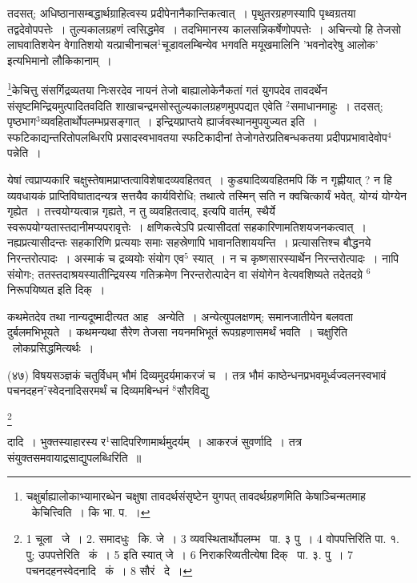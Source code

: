 \documentclass[11pt, openany]{book}
\newcommand\blfootnote[1]{%
 \begingroup
 \renewcommand\thefootnote{}\footnote{#1}%
 \addtocounter{footnote}{-1}%
 \endgroup
}
\begin{document}
\newpage
तदसत्; अधिष्ठानासम्बद्धार्थग्राहित्वस्य प्रदीपेनानैकान्तिकत्वात्~। पृथुतरग्रहणस्यापि पृथ्वग्रतया तद्वदेवोपपत्तेः~। तुल्यकालग्रहणं त्वसिद्धमेव~। तदभिमानस्य कालसन्निकर्षेणोपपत्तेः~। अचिन्त्यो हि तेजसो लाघवातिशयेन वेगातिशयो यत्प्राचीनाचल$^1$चूडावलम्बिन्येव भगवति मयूखमालिनि 'भवनोदरेषु आलोक' इत्यभिमानो लौकिकानाम्~।

\renewcommand{\thefootnote}{१}\footnote{चक्षुर्बाह्यालोकाभ्यामारब्धेन चक्षुषा तावदर्थसंसृष्टेन युगपत् तावदर्थग्रहणमिति केषाञ्चिन्मतमाह \textendash\ केचित्त्विति~। कि भा. प.~।}केचित्तु संसर्गिद्रव्यतया निःसरदेव नायनं तेजो बाह्यालोकेनैकतां गतं युगपदेव तावदर्थेन संसृष्टमिन्द्रियमुत्पादितवदिति शाखाचन्द्रमसोस्तुल्यकालग्रहणमुपपद्यत एवेति ${}^2$समाधानमाहुः~। तदसत्; पृष्ठभाग$^3$व्यवहितार्थोपलम्भप्रसङ्गात्~। इन्द्रियप्राप्तये ह्यार्जवस्थानमुपयुज्यत इति~। स्फटिकाद्यन्तरितोपलब्धिरपि प्रसादस्वभावतया स्फटिकादीनां तेजोगतेरप्रतिबन्धकतया प्रदीपप्रभावादेवोप$^4$पन्नेति~।

येषां त्वप्राप्यकारि चक्षुस्तेषामप्राप्तत्वाविशेषादव्यवहितवत्~। कुड्यादिव्यवहितमपि किं न गृह्णीयात् ? न हि व्यवधायकं प्राप्तिविघातादन्यत्र सत्तयैव कार्यविरोधि; तथात्वे तस्मिन् सति न क्वचित्कार्यं भवेत्, योग्यं योग्येन गृह्येत~। तत्त्वयोग्यत्वान्न गृह्यते, न तु व्यवहितत्वाद्, इत्यपि वार्तम्, स्थैर्ये स्वरूपयोग्यतास्तदानीमप्यपरावृत्तेः~। क्षणिकत्वेऽपि प्रत्यासीदतां सहकारिणामतिशयजनकत्वात्~। नह्यप्रत्यासीदन्तः सहकारिणि प्रत्ययाः समाः सहस्रेणापि भावानतिशाययन्ति~। प्रत्यासत्तिश्च बौद्धनये निरन्तरोत्पादः~। अस्माकं च द्रव्ययोः संयोग एव$^5$ स्यात्~। न च कृष्णसारस्यार्थेन निरन्तरोत्पादः~। नापि संयोगः; ततस्तदाश्रयस्यातीन्द्रियस्य गतिक्रमेण निरन्तरोत्पादेन वा संयोगेन वेत्यवशिष्यते तदेतदग्रे ${}^6$निरूपयिष्यत इति दिक्~।

कथमेतदेव तथा नान्यदूष्मादीत्यत आह \textendash\ {\knu अन्येति}~। अन्येत्युपलक्षणम्; समानजातीयेन बलवता दुर्बलमभिभूयते~। कथमन्यथा सैरेण तेजसा नयनमभिभूतं रूपग्रहणासमर्थं भवति~। चक्षुरिति \textendash\ लोकप्रसिद्धमित्यर्थः~।

\hangindent=2cm {\knu (४७) विषयसञ्ज्ञकं चतुर्विधम् भौमं दिव्यमुदर्यमाकरजं च~। तत्र भौमं काष्ठेन्धनप्रभवमूर्ध्वज्वलनस्वभावं पचनदहन$^7$स्वेदनादिसरमर्थं च दिव्यमबिन्धनं ${}^8$सौरविद्यु\textendash}

\blfootnote{1 चूला  \textendash\ जे~। 2. समादधुः  \textendash\ कि. जे~। 3 व्यवस्थितार्थोपलम्भ  \textendash\ पा. ३ पु~। 4 वोपपत्तिरिति पा. १. पु; उपपत्तेरिति  \textendash\ कं~। 5 इति स्यात् जे~। 6 निराकरिव्यतीत्येषा दिक्  \textendash\ पा. ३. पु~। 7 पचनदहनस्वेदनादि  \textendash\ कं~। 8 सौरं  \textendash\ दे~।}

\newpage
\indent
\hangindent=2cm {\knu दादि~। भुक्तस्याहारस्य र$^1$सादिपरिणामार्थमुदर्यम्~। आकरजं सुवर्णादि~। तत्र संयुक्तसमवायाद्रसाद्युपलब्धिरिति~॥}
\end{document}

